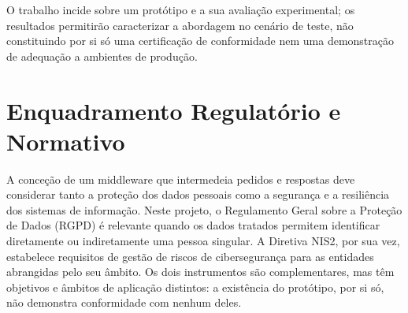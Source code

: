 \documentclass[12pt,reqno, twoside]{amsbook}
\theoremstyle{plain}
\numberwithin{equation}{chapter}
\numberwithin{table}{chapter}
\numberwithin{figure}{chapter}
\numberwithin{section}{chapter}
\begin{document}
\noindent O trabalho incide sobre um protótipo e a sua avaliação experimental; os resultados permitirão caracterizar a abordagem no cenário de teste, não constituindo por si só uma certificação de conformidade nem uma demonstração de adequação a ambientes de produção.
\chapter{Enquadramento Regulatório e Normativo}
\noindent A conceção de um middleware que intermedeia pedidos e respostas deve considerar tanto a proteção dos dados pessoais como a segurança e a resiliência dos sistemas de informação. Neste projeto, o Regulamento Geral sobre a Proteção de Dados (RGPD) é relevante quando os dados tratados permitem identificar diretamente ou indiretamente uma pessoa singular. A Diretiva NIS2, por sua vez, estabelece requisitos de gestão de riscos de cibersegurança para as entidades abrangidas pelo seu âmbito. Os dois instrumentos são complementares, mas têm objetivos e âmbitos de aplicação distintos: a existência do protótipo, por si só, não demonstra conformidade com nenhum deles.
\end{document}
